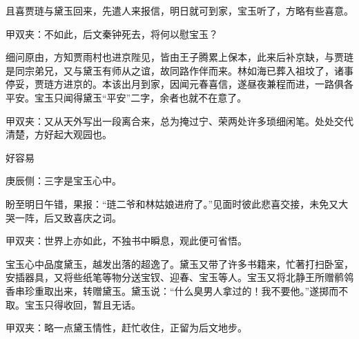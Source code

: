 \begin{parag}
    且喜贾琏与黛玉回来，先遣人来报信，明日就可到家，宝玉听了，方略有些喜意。\begin{note}甲双夹：不如此，后文秦钟死去，将何以慰宝玉？\end{note}细问原由，方知贾雨村也进京陛见，皆由王子腾累上保本，此来后补京缺，与贾琏是同宗弟兄，又与黛玉有师从之谊，故同路作伴而来。林如海已葬入祖坟了，诸事停妥，贾琏方进京的。本该出月到家，因闻元春喜信，遂昼夜兼程而进，一路俱各平安。宝玉只闻得黛玉“平安”二字，余者也就不在意了。\begin{note}甲双夹：又从天外写出一段离合来，总为掩过宁、荣两处许多琐细闲笔。处处交代清楚，方好起大观园也。\end{note}
\end{parag}


\begin{parag}
    好容易\begin{note}庚辰侧：三字是宝玉心中。\end{note}盼至明日午错，果报：“琏二爷和林姑娘进府了。”见面时彼此悲喜交接，未免又大哭一阵，后又致喜庆之词。\begin{note}甲双夹：世界上亦如此，不独书中瞬息，观此便可省悟。\end{note}宝玉心中品度黛玉，越发出落的超逸了。黛玉又带了许多书籍来，忙著打扫卧室，安插器具，又将些纸笔等物分送宝钗、迎春、宝玉等人。宝玉又将北静王所赠鹡鸰香串珍重取出来，转赠黛玉。黛玉说：“什么臭男人拿过的！我不要他。”遂掷而不取。宝玉只得收回，暂且无话。\begin{note}甲双夹：略一点黛玉情性，赶忙收住，正留为后文地步。\end{note}
\end{parag}


